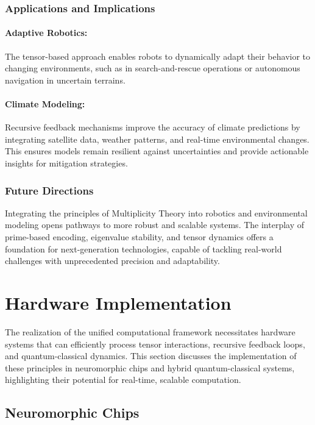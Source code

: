 \documentclass{article}
\theoremstyle{plain}
\begin{document}
\subsubsection{Applications and Implications}

\paragraph{Adaptive Robotics:} The tensor-based approach enables robots to dynamically adapt their behavior to changing environments, such as in search-and-rescue operations or autonomous navigation in uncertain terrains.

\paragraph{Climate Modeling:} Recursive feedback mechanisms improve the accuracy of climate predictions by integrating satellite data, weather patterns, and real-time environmental changes. This ensures models remain resilient against uncertainties and provide actionable insights for mitigation strategies.

\subsubsection{Future Directions}

Integrating the principles of Multiplicity Theory into robotics and environmental modeling opens pathways to more robust and scalable systems. The interplay of prime-based encoding, eigenvalue stability, and tensor dynamics offers a foundation for next-generation technologies, capable of tackling real-world challenges with unprecedented precision and adaptability.


\section{Hardware Implementation}

The realization of the unified computational framework necessitates hardware systems that can efficiently process tensor interactions, recursive feedback loops, and quantum-classical dynamics. This section discusses the implementation of these principles in neuromorphic chips and hybrid quantum-classical systems, highlighting their potential for real-time, scalable computation.

\subsection{Neuromorphic Chips}
\end{document}
